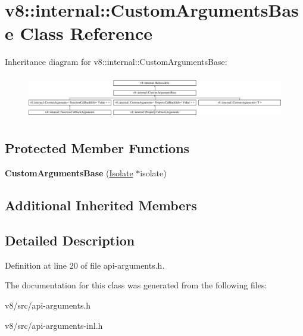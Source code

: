 \hypertarget{classv8_1_1internal_1_1CustomArgumentsBase}{}\section{v8\+:\+:internal\+:\+:Custom\+Arguments\+Base Class Reference}
\label{classv8_1_1internal_1_1CustomArgumentsBase}
Inheritance diagram for v8\+:\+:internal\+:\+:Custom\+Arguments\+Base\+:\begin{figure}[H]
\begin{center}
\leavevmode
\includegraphics[height=1.919452cm]{classv8_1_1internal_1_1CustomArgumentsBase}
\end{center}
\end{figure}
\subsection*{Protected Member Functions}
\begin{DoxyCompactItemize}
\item 
\mbox{\label{classv8_1_1internal_1_1CustomArgumentsBase_a1b1b18521edec11378f2dfc6426a8e78}} 
{\bfseries Custom\+Arguments\+Base} (\mbox{\hyperlink{classv8_1_1internal_1_1Isolate}{Isolate}} $\ast$isolate)
\end{DoxyCompactItemize}
\subsection*{Additional Inherited Members}


\subsection{Detailed Description}


Definition at line 20 of file api-\/arguments.\+h.



The documentation for this class was generated from the following files\+:\begin{DoxyCompactItemize}
\item 
v8/src/api-\/arguments.\+h\item 
v8/src/api-\/arguments-\/inl.\+h\end{DoxyCompactItemize}

